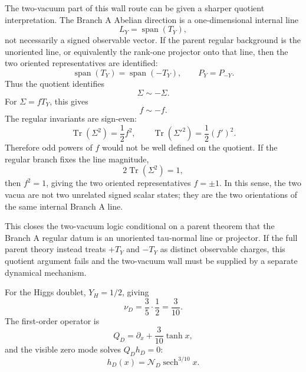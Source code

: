 \documentclass[11pt]{article}
\begin{document}
The two-vacuum part of this wall route can be given a sharper quotient
interpretation. The Branch A Abelian direction is a one-dimensional internal line
\begin{equation}
L_Y=\operatorname{span}(T_Y),
\end{equation}
not necessarily a signed observable vector. If the parent regular background is
the unoriented line, or equivalently the rank-one projector onto that line, then
the two oriented representatives are identified:
\begin{equation}
\operatorname{span}(T_Y)=\operatorname{span}(-T_Y),\qquad
P_Y=P_{-Y} .
\end{equation}
Thus the quotient identifies
\begin{equation}
\Sigma\sim-\Sigma .
\end{equation}
For $\Sigma=fT_Y$, this gives
\begin{equation}
f\sim -f .
\end{equation}
The regular invariants are sign-even:
\begin{equation}
\operatorname{Tr}(\Sigma^2)=\frac12 f^2,\qquad
\operatorname{Tr}(\Sigma'^2)=\frac12(f')^2 .
\end{equation}
Therefore odd powers of $f$ would not be well defined on the quotient. If the
regular branch fixes the line magnitude,
\begin{equation}
2\operatorname{Tr}(\Sigma^2)=1,
\end{equation}
then $f^2=1$, giving the two oriented representatives $f=\pm1$. In this sense,
the two vacua are not two unrelated signed scalar states; they are the two
orientations of the same internal Branch A line.

This closes the two-vacuum logic conditional on a parent theorem that the
Branch A regular datum is an unoriented tau-normal line or projector. If the
full parent theory instead treats $+T_Y$ and $-T_Y$ as distinct observable
charges, this quotient argument fails and the two-vacuum wall must be supplied
by a separate dynamical mechanism.

For the Higgs doublet, $Y_H=1/2$, giving
\begin{equation}
\nu_D=\frac35\cdot\frac12=\frac3{10} .
\end{equation}
The first-order operator is
\begin{equation}
Q_D=\partial_x+\frac3{10}\tanh x,
\end{equation}
and the visible zero mode solves $Q_Dh_D=0$:
\begin{equation}
h_D(x)=\mathcal{N}_D\operatorname{sech}^{3/10}x .
\end{equation}
\end{document}
